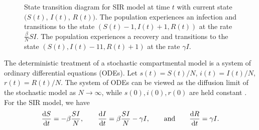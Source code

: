 \begin{figure}
    \centering
    \caption[State transition diagram for SIR model.]{State transition diagram for SIR model at time \( t \) with current state \( (S(t) \), \( I(t) \),  \( R(t)) \).
    The population experiences an infection and transitions to the state \( (S(t)-1, I(t)+1, R(t)) \) at the rate \( \frac{\beta}{N}SI \).
    The population experiences a recovery and transitions to the state \( (S(t), I(t)-11, R(t)+1) \) at the rate \( \gamma I \).
    }
    \label{ch_2:fig:stocastic_SIR}
\end{figure}

The deterministic treatment of a stochastic compartmental model is a system of ordinary differential equations (ODEs).
Let \( s(t) = S(t) / N \), \( i(t) = I(t) / N \), \( r(t) = R(t) / N \).
The system of ODEs can be viewed as the diffusion limit of the stochastic model as \( N \to \infty \), while \( s(0), i(0), r(0) \) are held constant \citep{Greenwood2009, fuchs2013inference}.
For the SIR model, we have 
\begin{equation}
    \frac{\mathrm{d} S}{\mathrm{d} t} = -\beta \frac{SI}{N}, \qquad
    \frac{\mathrm{d} I}{\mathrm{d} t} = \beta \frac{SI}{N} - \gamma I, \qquad
    \text{and} \qquad
    \frac{\mathrm{d} R}{\mathrm{d} t} = \gamma I
    \text{.}
\label{ch_2:SIR_diff_eq}
\end{equation}

